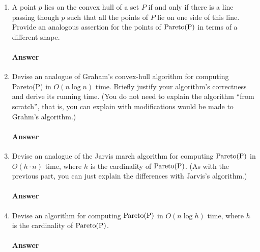 \documentclass{article}
\newcommand{\pareto}[1]{\rm{Pareto}(#1)}
\begin{document}
\begin{enumerate}

    \item A point $p$ lies on the convex hull of a set $P$ if and only if there is
        a line passing though $p$ such that all the points of $P$ lie on one side of
        this line.  Provide an analogous assertion for the points of $\pareto{P}$ in
        terms of a different shape.

        \paragraph{Answer}

    \item Devise an analogue of Graham's convex-hull algorithm for computing
        \pareto{P} in $O(n \log n)$ time.  Briefly justify your algorithm's correctness
        and derive its running time.  (You do not need to explain the algorithm ``from
        scratch'', that is, you can explain with modifications would be made to Grahm's
        algorithm.)

        \paragraph{Answer}

    \item Devise an analogue of the Jarvis march algorithm for computing
        $\pareto{P}$ in $O(h \cdot n)$ time, where $h$ is the cardinality of
        $\pareto{P}$.  (As with the previous part, you can just explain the differences
        with Jarvis's algorithm.)

        \paragraph{Answer}

    \item Devise an algorithm for computing $\pareto{P}$ in $O(n
        \log h)$ time, where $h$ is the cardinality of $\pareto{P}$.

        \paragraph{Answer}

\end{enumerate}
\end{document}
